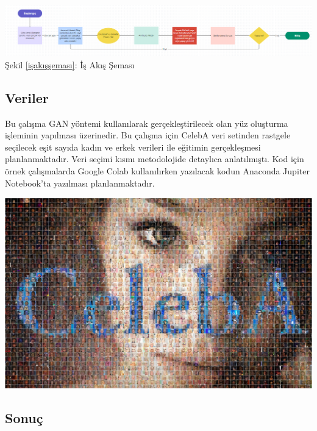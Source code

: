 \documentclass[12pt, a4paper]{article}
\begin{document}
\begin{enumerate}
		
		
		\includegraphics[width=1\textwidth]{işakışşeması}
		\label{işakışşeması}
		Şekil \ref{işakışşeması}: İş Akış Şeması
	\end{enumerate}
\begin{center}
		\section{Veriler}
\end{center}
	\begin{flushleft}
		Bu çalışma GAN yöntemi kullanılarak gerçekleştirilecek olan yüz oluşturma işleminin yapılması üzerinedir. Bu çalışma için CelebA\cite{CelebAMask-HQ} veri setinden rastgele seçilecek eşit sayıda kadın ve erkek verileri ile eğitimin gerçekleşmesi planlanmaktadır. Veri seçimi kısmı metodolojide detaylıca anlatılmıştı.
		Kod için örnek çalışmalarda Google Colab kullanılırken yazılacak kodun Anaconda Jupiter Notebook'ta yazılması planlanmaktadır. 
		
		\includegraphics[width=1\textwidth]{abc}
	\end{flushleft}
\begin{center}
		\section{Sonuç}
\end{center}
\end{document}

